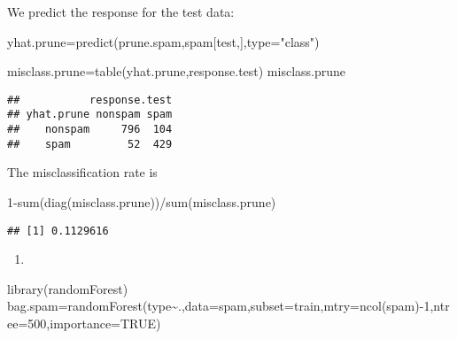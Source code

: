 \documentclass[
]{article}
\newenvironment{Shaded}{\begin{snugshade}}{\end{snugshade}}
\newcommand{\AttributeTok}[1]{\textcolor[rgb]{0.77,0.63,0.00}{#1}}
\newcommand{\ConstantTok}[1]{\textcolor[rgb]{0.00,0.00,0.00}{#1}}
\newcommand{\DecValTok}[1]{\textcolor[rgb]{0.00,0.00,0.81}{#1}}
\newcommand{\FunctionTok}[1]{\textcolor[rgb]{0.00,0.00,0.00}{#1}}
\newcommand{\NormalTok}[1]{#1}
\newcommand{\OtherTok}[1]{\textcolor[rgb]{0.56,0.35,0.01}{#1}}
\newcommand{\SpecialCharTok}[1]{\textcolor[rgb]{0.00,0.00,0.00}{#1}}
\newcommand{\StringTok}[1]{\textcolor[rgb]{0.31,0.60,0.02}{#1}}
\providecommand{\tightlist}{%
  \setlength{\itemsep}{0pt}\setlength{\parskip}{0pt}}
\begin{document}
We predict the response for the test data:

\begin{Shaded}
\begin{Highlighting}[]
\NormalTok{yhat.prune}\OtherTok{=}\FunctionTok{predict}\NormalTok{(prune.spam,spam[test,],}\AttributeTok{type=}\StringTok{"class"}\NormalTok{)}

\NormalTok{misclass.prune}\OtherTok{=}\FunctionTok{table}\NormalTok{(yhat.prune,response.test)}
\NormalTok{misclass.prune}
\end{Highlighting}
\end{Shaded}

\begin{verbatim}
##           response.test
## yhat.prune nonspam spam
##    nonspam     796  104
##    spam         52  429
\end{verbatim}

The misclassification rate is

\begin{Shaded}
\begin{Highlighting}[]
\DecValTok{1}\SpecialCharTok{{-}}\FunctionTok{sum}\NormalTok{(}\FunctionTok{diag}\NormalTok{(misclass.prune))}\SpecialCharTok{/}\FunctionTok{sum}\NormalTok{(misclass.prune)}
\end{Highlighting}
\end{Shaded}

\begin{verbatim}
## [1] 0.1129616
\end{verbatim}

\begin{enumerate}
\def\labelenumi{\alph{enumi})}
\setcounter{enumi}{5}
\tightlist
\item
\end{enumerate}

\begin{Shaded}
\begin{Highlighting}[]
\FunctionTok{library}\NormalTok{(randomForest)}
\NormalTok{bag.spam}\OtherTok{=}\FunctionTok{randomForest}\NormalTok{(type}\SpecialCharTok{\textasciitilde{}}\NormalTok{.,}\AttributeTok{data=}\NormalTok{spam,}\AttributeTok{subset=}\NormalTok{train,}\AttributeTok{mtry=}\FunctionTok{ncol}\NormalTok{(spam)}\SpecialCharTok{{-}}\DecValTok{1}\NormalTok{,}\AttributeTok{ntree=}\DecValTok{500}\NormalTok{,}\AttributeTok{importance=}\ConstantTok{TRUE}\NormalTok{)}
\end{Highlighting}
\end{Shaded}
\end{document}
